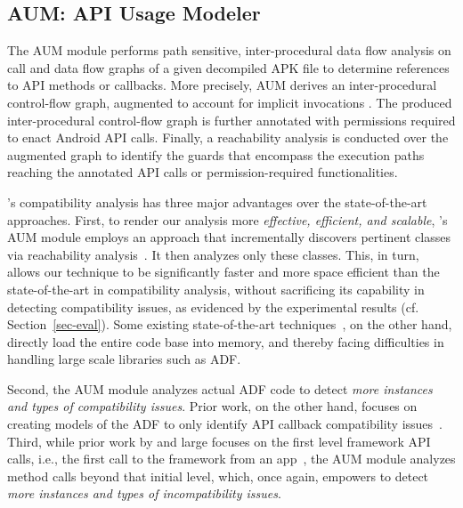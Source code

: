 \subsection{AUM: API Usage Modeler}
\label{API Usage Extraction}

The AUM module performs path sensitive, inter-procedural
data flow analysis on call and data flow graphs of a given
decompiled APK file to determine references to API methods
or callbacks.  More precisely, AUM derives an
inter-procedural control-flow graph, augmented to account
for implicit invocations . The produced inter-procedural
control-flow graph is further annotated with permissions
required to enact Android API calls. Finally, a reachability
analysis is conducted over the augmented graph to identify
the guards that encompass the execution paths reaching the
annotated API calls or permission-required functionalities. 


\@approach's compatibility analysis has three major
advantages over the state-of-the-art approaches.  First,  to
render our analysis more \emph{effective, efficient, and
scalable}, 
\@approach's AUM module employs an approach that
incrementally discovers pertinent classes via reachability
analysis~\cite{tsutano2017efficient}.  It then analyzes only
these classes. This, in turn, allows our technique to be
significantly faster and more space efficient than the
state-of-the-art in compatibility analysis, without
sacrificing its capability in detecting compatibility
issues, as evidenced by the experimental results (cf.
Section~\ref{sec-eval}).  Some existing state-of-the-art
techniques~\cite{huang2018understanding,he2018understanding},
on the other hand, directly load the entire code base into
memory, and thereby facing difficulties in handling large
scale libraries such as ADF. 


Second, the AUM module analyzes actual ADF code to detect
\emph{more instances and types of compatibility issues}.
Prior work, on the other hand, focuses on creating models of
the ADF to only identify API callback compatibility
issues~\cite{huang2018understanding}.  Third, while prior
work by and large focuses on the first level framework API
calls, i.e., the first call to the framework from an
app~\cite{lili2018cid}, the AUM module analyzes method calls
beyond that initial level, which, once again, empowers
\@approach to detect \emph{more instances and types of
incompatibility issues}. 

